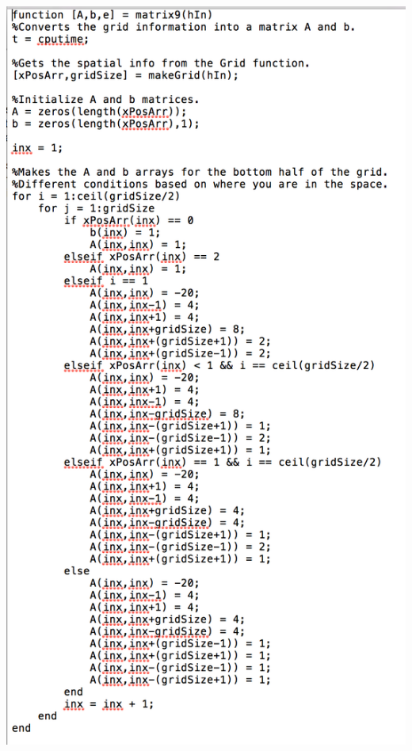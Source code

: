 \documentclass[11pt, oneside]{article}   	%
\begin{document}
\centerline{\includegraphics[scale = 0.7]{matrix9Code_1.png}} 
\end{document}
